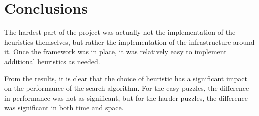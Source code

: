 \documentclass[12pt, english]{article}
\begin{document}
    \begin{center}
    \end{center}

    \section{Conclusions}

    The hardest part of the project was actually not the implementation of the heuristics
    themselves, but rather the implementation of the infrastructure around it. Once the
    framework was in place, it was relatively easy to implement additional heuristics
    as needed.

    From the results, it is clear that the choice of heuristic has a significant impact
    on the performance of the search algorithm. For the easy puzzles, the difference in
    performance was not as significant, but for the harder puzzles, the difference was
    significant in both time and space.
\end{document}
